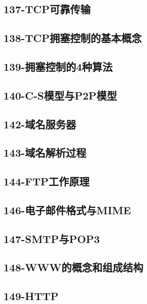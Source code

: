 \subsection{137-TCP可靠传输}

\subsection{138-TCP拥塞控制的基本概念}

\subsection{139-拥塞控制的4种算法}

\subsection{140-C-S模型与P2P模型}

\subsection{142-域名服务器}

\subsection{143-域名解析过程}

\subsection{144-FTP工作原理}

\subsection{146-电子邮件格式与MIME}

\subsection{147-SMTP与POP3}

\subsection{148-WWW的概念和组成结构}

\subsection{149-HTTP}

